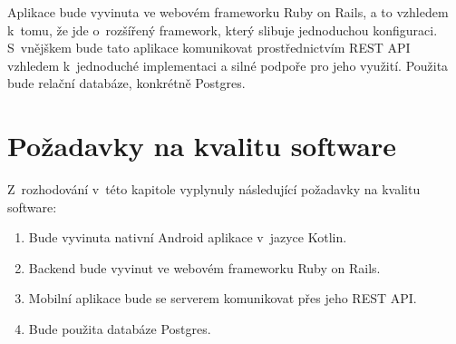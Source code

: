 \documentclass[twoside]{ctuthesis}
\begin{document}
Aplikace bude vyvinuta ve webovém frameworku Ruby on Rails, a to vzhledem k~tomu, že jde o~rozšířený framework, který slibuje jednoduchou konfiguraci. S~vnějškem bude tato aplikace komunikovat prostřednictvím REST API vzhledem k~jednoduché implementaci a silné podpoře pro jeho využití. Použita bude relační databáze, konkrétně Postgres.

\section{Požadavky na kvalitu software}

Z~rozhodování v~této kapitole vyplynuly následující požadavky na kvalitu software:

\begin{enumerate}[label=\textbf{S\arabic*.}]
	\item Bude vyvinuta nativní Android aplikace v~jazyce Kotlin.
	\item Backend bude vyvinut ve webovém frameworku Ruby on Rails.
	\item Mobilní aplikace bude se serverem komunikovat přes jeho REST API.
	\item Bude použita databáze Postgres.
\end{enumerate}
\end{document}

